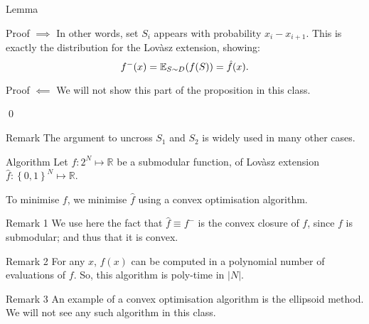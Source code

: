 \documentclass[a4paper]{article}
\begin{document}
\begin{parag}{Lemma}
\begin{subparag}{Proof $\implies$}
        In other words, set $S_i$ appears with probability $x_i - x_{i+1}$. This is exactly the distribution for the Lovàsz extension, showing: 
        \[f^-\left(x\right) = \exval_{S \followsdistr D}\left(f\left(S\right)\right) = \hat{f}\left(x\right).\]
    \end{subparag}

    \begin{subparag}{Proof $\impliedby$}
        We will not show this part of the proposition in this class.

        \qed
    \end{subparag}

    \begin{subparag}{Remark}
        The argument to uncross $S_1$ and $S_2$ is widely used in many other cases.
    \end{subparag}
\end{parag}

\begin{parag}{Algorithm}
    Let $f: 2^N \mapsto \mathbb{R}$ be a submodular function, of Lovàsz extension $\hat{f}: \left\{0, 1\right\}^N \mapsto \mathbb{R}$. 

    To minimise $f$, we minimise $\hat{f}$ using a convex optimisation algorithm. 

    \begin{subparag}{Remark 1}
        We use here the fact that $\hat{f} \equiv f^-$ is the convex closure of $f$, since $f$ is submodular; and thus that it is convex.
    \end{subparag}

    \begin{subparag}{Remark 2}
        For any $x$, $\hat{f}\left(x\right)$ can be computed in a polynomial number of evaluations of $f$. So, this algorithm is poly-time in $\left|N\right|$.
    \end{subparag}
    
    \begin{subparag}{Remark 3}
        An example of a convex optimisation algorithm is the ellipsoid method. We will not see any such algorithm in this class.
    \end{subparag}
\end{parag}
\end{document}
